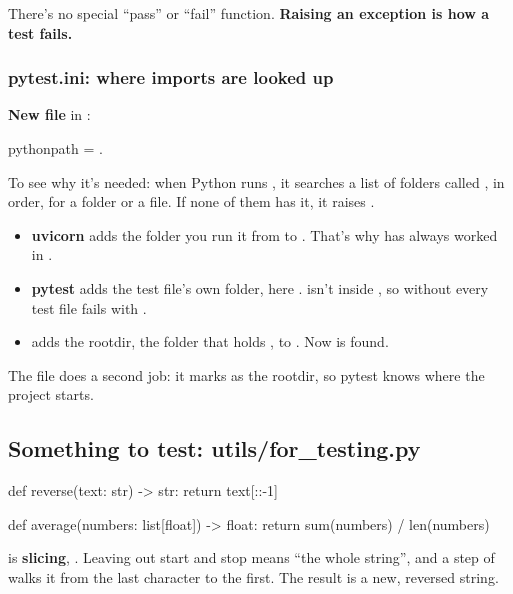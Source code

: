 There's no special ``pass'' or ``fail'' function. \textbf{Raising an exception is how a test fails.}

\subsubsection{pytest.ini: where imports are looked up}

\textbf{New file}  in :

\begin{code}
[pytest]
pythonpath = .
\end{code}

To see why it's needed: when Python runs , it searches a list of folders called , in order, for a  folder or a  file. If none of them has it, it raises .

\begin{itemize}
\item \textbf{uvicorn} adds the folder you run it from to . That's why  has always worked in .
\item \textbf{pytest} adds the test file's own folder, here .  isn't inside , so without  every test file fails with .
\item {} adds the rootdir, the folder that holds , to . Now  is found.
\end{itemize}

The file does a second job: it marks  as the rootdir, so pytest knows where the project starts.

\subsection{Something to test: utils/for\_testing.py}

\begin{py}
def reverse(text: str) -> str:
	return text[::-1]


def average(numbers: list[float]) -> float:
	return sum(numbers) / len(numbers)
\end{py}

 is \textbf{slicing}, . Leaving out start and stop means ``the whole string'', and a step of  walks it from the last character to the first. The result is a new, reversed string.


